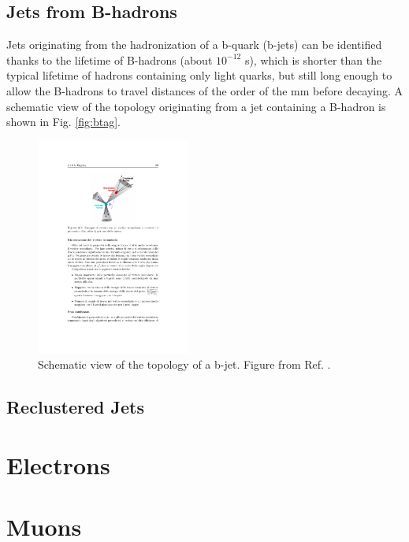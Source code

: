 \subsection{Jets from B-hadrons}

Jets originating from the hadronization of a b-quark (b-jets) can be identified thanks to the lifetime of B-hadrons (about $10^{-12}$ s), which is shorter than the typical lifetime of hadrons containing only light quarks, but still long enough to allow the B-hadrons to travel distances of the order of the mm before decaying. A schematic view of the topology originating from a jet containing a B-hadron is shown in Fig. \ref{fig:btag}.


\begin{figure}[h]
\begin{center}
\includegraphics[width=0.45\textwidth]{./figures/objects/secvtx.pdf}
\end{center}
\caption[Schematic view of the topology of a b-jet.]{Schematic view of the topology of a b-jet. Figure from Ref. \cite{dobtagging}.}
\end{figure}


\subsection{Reclustered Jets}


\section{Electrons}

\section{Muons}

